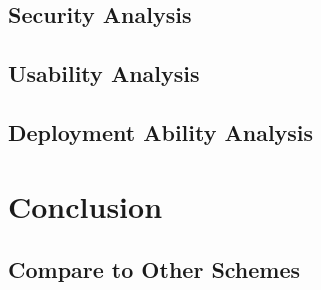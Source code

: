 \begin{CJK}{Bg5}{bsmi}
\section{Security Analysis}

\begin{comment}
This is the most important part of an authentication system.
We have to define our threat model before we start to analyze.
There are 4 components in the scheme I proposed.
\end{comment}

\section{Usability Analysis}

\begin{comment}
The usability can not be neglected when researchers trying to design a system.
Usability is a subjective perception, it may be different from person to person.
The following paragragh states the criterias I used to estimate the usability of a system.
\end{comment}

\section{Deployment Ability Analysis}

\begin{comment}
The deployment ability is also an important thing which is need to be considered, especially in designing an authentication system.
A system with high usability means it is friendly to users; a system with high deployment ability means it is friendly to the system provider or, more precise, the developers.
The following paragraph states the criterias I used to estimate a system's deployment ability. 
\end{comment}

\chapter{Conclusion}

\section{Compare to Other Schemes}

\end{CJK}
